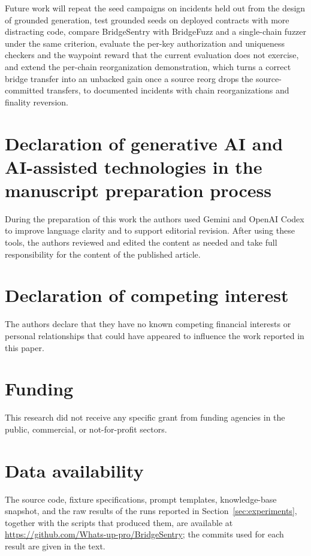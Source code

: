 \documentclass[a4paper]{cas-sc}
\begin{document}
Future work will repeat the seed campaigns on incidents held out from the design of grounded generation, test grounded seeds on deployed contracts with more distracting code, compare BridgeSentry with BridgeFuzz and a single-chain fuzzer under the same criterion, evaluate the per-key authorization and uniqueness checkers and the waypoint reward that the current evaluation does not exercise, and extend the per-chain reorganization demonstration, which turns a correct bridge transfer into an unbacked gain once a source reorg drops the source-committed transfers, to documented incidents with chain reorganizations and finality reversion.

\section*{Declaration of generative AI and AI-assisted technologies in the manuscript preparation process}
During the preparation of this work the authors used Gemini and OpenAI Codex to improve language clarity and to support editorial revision. After using these tools, the authors reviewed and edited the content as needed and take full responsibility for the content of the published article.

\section*{Declaration of competing interest}
The authors declare that they have no known competing financial interests or personal relationships that could have appeared to influence the work reported in this paper.

\section*{Funding}
This research did not receive any specific grant from funding agencies in the public, commercial, or not-for-profit sectors.

\section*{Data availability}
The source code, fixture specifications, prompt templates, knowledge-base snapshot, and the raw results of the runs reported in Section~\ref{sec:experiments}, together with the scripts that produced them, are available at \url{https://github.com/Whats-up-pro/BridgeSentry}; the commits used for each result are given in the text.



\end{document}
